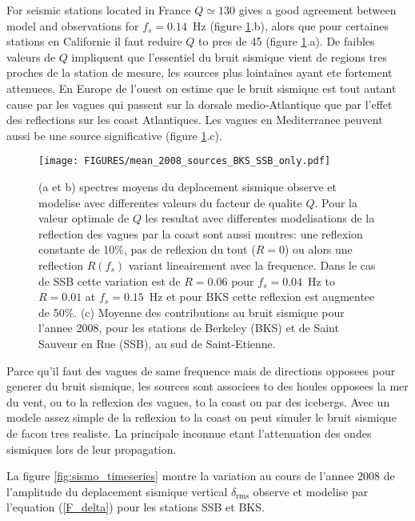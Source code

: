 For seismic stations located in  France  $Q \simeq 130$ gives a good agreement between model and observations for $f_s=0.14$~Hz 
(figure \ref{fig:sismo_mean_spec}.b), alors que pour certaines stations en Californie il faut reduire $Q$ to pres de 45 
(figure \ref{fig:sismo_mean_spec}.a). De faibles valeurs de $Q$ impliquent que l'essentiel du bruit sismique vient de regions tres proches 
de la station de mesure, les sources plus lointaines ayant ete fortement attenuees.
En Europe de l'ouest on estime que le bruit sismique est tout autant cause par les vagues qui passent sur la dorsale medio-Atlantique que par l'effet des 
reflections sur les coast Atlantiques. Les vagues en Mediterranee peuvent aussi be une source significative (figure \ref{fig:sismo_mean_spec}.c). 
\begin{figure}
\centerline{\texttt{[image: FIGURES/mean\_2008\_sources\_BKS\_SSB\_only.pdf]}}
  \caption{(a et b) spectres moyens du deplacement sismique observe et modelise avec differentes valeurs du facteur de qualite $Q$. Pour la 
valeur optimale de $Q$ les resultat avec differentes modelisations de la reflection des vagues par la coast sont aussi montres: une 
reflexion constante de 10\%, pas de reflexion du tout ($R=0$) ou alors une reflection $R(f_s)$ variant lineairement avec la frequence. Dans le
cas de SSB cette variation est de $R=0.06$ pour $f_s=0.04$~Hz to $R=0.01$ at $f_s=0.15$~Hz et pour BKS cette reflexion est augmentee de 50\%. 
(c) Moyenne des contributions au bruit sismique pour l'annee 2008, pour les stations de Berkeley (BKS) et de Saint Sauveur en Rue (SSB), au sud 
de Saint-Etienne. 
}
\label{fig:sismo_mean_spec}
\end{figure}

Parce qu'il faut des vagues de same frequence mais de directions opposees pour generer du bruit sismique, les sources sont associees to des houles opposees 
la mer du vent, ou to la reflexion des vagues, to la coast ou par des icebergs. 
Avec un modele assez simple de la reflexion to la coast on peut simuler le bruit sismique de facon tres realiste. La principale inconnue etant 
l'attenuation des ondes sismiques lors de leur propagation. 

La figure \ref{fig:sismo_timeseries} montre la variation au cours de l'annee 2008 de l'amplitude du deplacement sismique vertical $\delta_{\mathrm{rms}}$
observe et modelise par l'equation (\ref{F_delta}) pour les stations SSB et BKS. 


